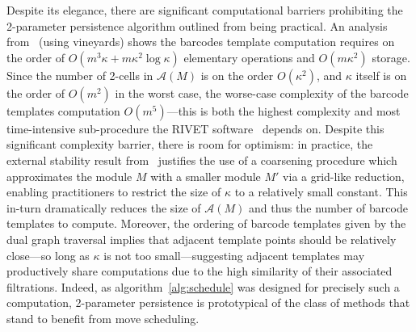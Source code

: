 \documentclass[sn-mathphys]{sn-jnl}
\begin{document}
Despite its elegance, there are significant computational barriers prohibiting the 2-parameter persistence algorithm outlined from being practical. 
An analysis from~\cite{lesnick2015interactive} (using vineyards) shows the barcodes template computation requires on the order of $O(m^3 \kappa + m \kappa^2 \log \kappa)$ elementary operations and $O(m \kappa^2)$ storage.
Since the number of 2-cells in $\mathcal{A}(M)$ is on the order $O(\kappa^2)$, and $\kappa$ itself is on the order of $O(m^2)$ in the worst case, the worse-case complexity of the barcode templates computation $O(m^5)$---this is both the highest complexity and most time-intensive sub-procedure the RIVET software~\cite{rivet} depends on. 
Despite this significant complexity barrier, there is room for optimism: in practice, the external stability result from~\cite{landi2014rank} justifies the use of a coarsening procedure which approximates the module $M$ with a smaller module $M'$ via a grid-like reduction, enabling practitioners to restrict the size of $\kappa$ to a relatively small constant. 
This in-turn dramatically reduces the size of $\mathcal{A}(M)$ and thus the number of barcode templates to compute. 
Moreover, the ordering of barcode templates given by the dual graph traversal implies that adjacent  template points should be relatively close---so long as $\kappa$ is not too small---suggesting adjacent templates may productively share computations due to the high similarity of their associated filtrations. 
Indeed, as algorithm~\ref{alg:schedule} was designed for precisely such a computation, 2-parameter persistence is prototypical of the class of methods that stand to benefit from move scheduling. 
\end{document}
